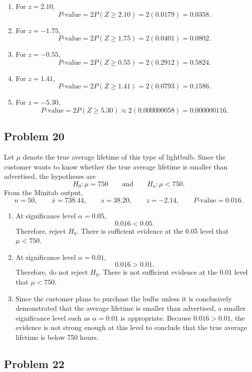 \documentclass[11pt]{article}
\begin{document}
\begin{enumerate}
\item[(a)] For $z=2.10$,
\[
P\text{-value}=2P(Z\ge 2.10)=2(0.0179)=0.0358.
\]

\item[(b)] For $z=-1.75$,
\[
P\text{-value}=2P(Z\ge 1.75)=2(0.0401)=0.0802.
\]

\item[(c)] For $z=-0.55$,
\[
P\text{-value}=2P(Z\ge 0.55)=2(0.2912)=0.5824.
\]

\item[(d)] For $z=1.41$,
\[
P\text{-value}=2P(Z\ge 1.41)=2(0.0793)=0.1586.
\]

\item[(e)] For $z=-5.30$,
\[
P\text{-value}=2P(Z\ge 5.30)\approx 2(0.000000058)=0.000000116.
\]
\end{enumerate}

\subsection*{Problem 20}

Let $\mu$ denote the true average lifetime of this type of lightbulb. Since the customer wants to know whether the true average lifetime is smaller than advertised, the hypotheses are
\[
H_0:\mu=750
\qquad \text{and} \qquad
H_a:\mu<750.
\]
From the Minitab output,
\[
n=50,
\qquad \bar{x}=738.44,
\qquad s=38.20,
\qquad z=-2.14,
\qquad P\text{-value}=0.016.
\]

\begin{enumerate}
\item[(a)] At significance level $\alpha=0.05$,
\[
0.016<0.05.
\]
Therefore, reject $H_0$. There is sufficient evidence at the 0.05 level that $\mu<750$.

\item[(b)] At significance level $\alpha=0.01$,
\[
0.016>0.01.
\]
Therefore, do not reject $H_0$. There is not sufficient evidence at the 0.01 level that $\mu<750$.

\item[(c)] Since the customer plans to purchase the bulbs unless it is conclusively demonstrated that the average lifetime is smaller than advertised, a smaller significance level such as $\alpha=0.01$ is appropriate. Because $0.016>0.01$, the evidence is not strong enough at this level to conclude that the true average lifetime is below 750 hours.
\end{enumerate}

\subsection*{Problem 22}
\end{document}
